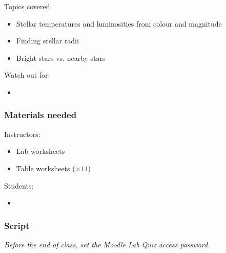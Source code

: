 \documentclass[12pt]{article}
\begin{document}
Topics covered:
\begin{itemize}
\item Stellar temperatures and luminosities from colour and magnitude
\item Finding stellar radii
\item Bright stars vs. nearby stars
\end{itemize}

\noindent
Watch out for:
\begin{itemize}
\item 
\end{itemize}


\subsubsection{Materials needed}

Instructors:
\begin{itemize}
  \item Lab worksheets
  \item Table worksheets ($\times 11$)
\end{itemize}

\noindent
Students:
\begin{itemize}
  \item 
\end{itemize}


\subsubsection{Script}


\emph{Before the end of class, set the Moodle Lab Quiz access password.}
\end{document}
